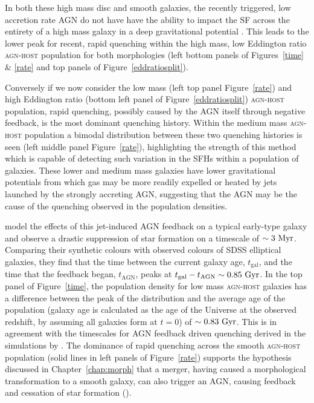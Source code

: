 In both these high mass disc and smooth galaxies, the recently triggered, low accretion rate AGN do not have have the ability to impact the SF across the entirety of a high mass galaxy in a deep gravitational potential \citep{ishibashi12, Zinn13}. This leads to the lower peak for recent, rapid quenching within the high mass, low Eddington ratio \textsc{agn-host} population for both morphologies (left bottom panels of Figures~\ref{time} \& \ref{rate} and top panels of Figure~\ref{eddratiosplit}). 

Conversely if we now consider the low mass (left top panel Figure~\ref{rate}) and high Eddington ratio (bottom left panel of Figure~\ref{eddratiosplit}) \textsc{agn-host} population, rapid quenching, possibly caused by the AGN itself through negative feedback, is the most dominant quenching history. Within the medium mass \textsc{agn-host} population a bimodal distribution between these two quenching histories is seen (left middle panel Figure~\ref{rate}), highlighting the strength of this method which is capable of detecting such variation in the SFHs within a population of galaxies. These lower and medium mass galaxies have lower gravitational potentials from which gas may be more readily expelled or heated \citep{tortora09} by jets launched by the strongly accreting AGN, suggesting that the AGN may be the cause of the quenching observed in the population densities.

\cite{tortora09} model the effects of this jet-induced AGN feedback on a typical early-type galaxy and observe a drastic suppression of star formation on a timescale of $\sim 3 ~\rm{Myr}$. Comparing their synthetic colours with observed colours of SDSS elliptical galaxies, they find that the time between the current galaxy age, $t_\mathrm{gal}$, and the time that the feedback began, $t_\mathrm{AGN}$, peaks at $t_\mathrm{gal} - t_\mathrm{AGN} \sim 0.85 ~\rm{Gyr}$. In the top panel of Figure~\ref{time}, the population density for low mass \textsc{agn-host} galaxies has a difference between the peak of the distribution and the average age of the population (galaxy age is calculated as the age of the Universe at the observed redshift, by assuming all galaxies form at $t=0$) of $\sim0.83 ~\rm{Gyr}$. This is in agreement with the timescales for AGN feedback driven quenching derived in the simulations by \citet{tortora09}. The dominance of rapid quenching across the smooth \textsc{agn-host} population (solid lines in left panels of Figure~\ref{rate}) supports the hypothesis discussed in Chapter~\ref{chap:morph} that a merger, having caused a morphological transformation to a smooth galaxy, can also trigger an AGN, causing feedback and cessation of star formation (\citealt{sanders88, pontzen16}).

